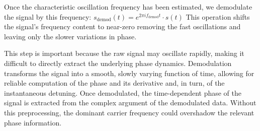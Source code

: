 Once the characteristic oscillation frequency has been estimated, we demodulate the signal by this frequency: $s_{\text{demod}}(t) = e^{2\pi i f_{\text{demod}} t} \cdot s(t)$
This operation shifts the signal's frequency content to near-zero removing the fast oscillations and leaving only the slower variations in phase.

This step is important because the raw signal may oscillate rapidly, making it difficult to directly extract the underlying phase dynamics. 
Demodulation transforms the signal into a smooth, slowly varying function of time, allowing for reliable computation of the phase and its derivative and, in turn, of the instantaneous detuning.
Once demodulated, the time-dependent phase of the signal is extracted from the complex argument of the demodulated data. 
Without this preprocessing, the dominant carrier frequency could overshadow the relevant phase information.

